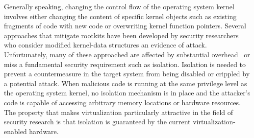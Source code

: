 Generally speaking, changing the control flow of the operating system kernel involves either changing the content of specific kernel objects such as existing fragments of code with new code or overwriting kernel function pointers.
Several approaches that mitigate rootkits have been developed by security researchers who consider modified kernel-data structures an evidence of attack. Unfortunately, many of these approached are affected by substantial overhead~\cite{livewire,5} or miss a fundamental security requirement such as isolation\cite{hookscout}. 
Isolation is needed to prevent a countermeasure in the target system from being disabled or crippled by a potential attack. When malicious code is running at the same privilege level as the operating system kernel, no isolation mechanism is in place and the attacker's code is capable of accessing arbitrary memory locations or hardware resources.
The property that makes virtualization particularly attractive in the field of security research is that isolation is guaranteed by the current virtualization-enabled hardware. 

